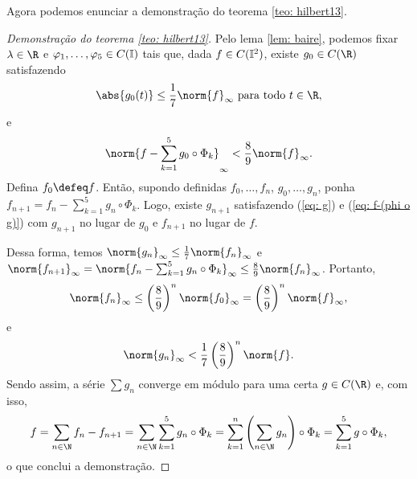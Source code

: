 Agora podemos enunciar a demonstração do teorema \ref{teo: hilbert13}.
\begin{proof}[Demonstração do teorema \ref{teo: hilbert13}]
    Pelo lema \ref{lem: baire}, podemos fixar \( \lambda \in \R \) e \( \varphi_{ 1 }, \dots, \varphi_{ 5 } \in C(\mathbb{I}) \) tais que, dada \( f \in C(\mathbb{I}^2) \), existe \( g_{ 0 } \in C(\R) \) satisfazendo
    \begin{equation}
        \abs{ g_{ 0 }(t) } \leq \frac{ 1 }{ 7 } \norm{ f }_{ \infty } \text{ para todo } t \in \R
        \label{eq: g}
    ,\end{equation}
    e
    \begin{equation}
        \norm{ 
            f -
            \sum_{ k=1 }^{ 5 } g_{ 0 } \circ \Phi_{ k }
         }_{ \infty }
         < \frac{ 8 }{ 9 } \norm{ f }_{ \infty }
         \label{eq: f-(phi o g)}
    .\end{equation}
    Defina \( f_{ 0 } \defeq f \). Então, supondo definidas \( f_{ 0 }, \dots, f_{ n } \), \( g_{ 0 }, \dots, g_{ n } \), ponha \( f_{ n+1 } = f_{ n } - \sum_{ k=1 }^{ 5 } g_{ n } \circ \Phi_{ k } \).
    Logo, existe \( g_{ n+1 } \) satisfazendo (\ref{eq: g}) e (\ref{eq: f-(phi o g)}) com \( g_{ n+1 } \) no lugar de \( g_{ 0 } \) e \( f_{ n+1 } \) no lugar de \( f \).
    
    Dessa forma, temos \( \norm{ g_{ n } }_{ \infty } \leq \frac{ 1 }{ 7 } \norm{ f_{ n } }_{ \infty } \) e \( \norm{ f_{ n+1 } }_{ \infty } = \norm{ f_{ n } - \sum_{ k=1 }^{ 5 } g_{ n } \circ \Phi_{ k } }_{ \infty } \leq \frac{ 8 }{ 9 } \norm{ f_{ n } }_{ \infty } \).
    Portanto, \[
        \norm{ f_{ n } }_{ \infty } \leq \left( \frac{ 8 }{ 9 } \right)^{ n } \norm{ f_{ 0 } }_{ \infty } = \left( \frac{ 8 }{ 9 } \right)^{ n } \norm{ f }_{ \infty }
    ,\]
    e \[
        \norm{ g_{ n } }_{ \infty } <
        \frac{ 1 }{ 7 } \left( \frac{ 8 }{ 9 } \right)^{ n } \norm{ f }
    .\]
    Sendo assim, a série \( \sum g_{ n } \) converge em módulo para uma certa \( g \in C(\R) \) e, com isso, \[
        f = \sum_{ n\in\N } f_{ n } - f_{ n+1 }
        = \sum_{ n\in\N } \sum_{ k=1 }^{ 5 } g_{ n } \circ \Phi_{ k }
        = \sum_{ k=1 }^{ n } \left( 
            \sum_{ n\in\N } g_{ n }
         \right)
         \circ \Phi_{ k }
        = \sum_{ k=1 }^{ 5 } g \circ \Phi_{ k }
    ,\]
    o que conclui a demonstração.
\end{proof}